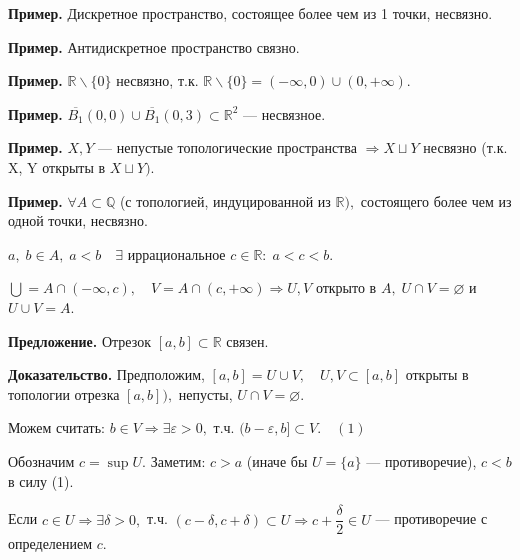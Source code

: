 \documentclass[12pt,a4paper]{article}
\begin{document}
\textbf{Пример.} Дискретное пространство, состоящее более чем из 1 точки, несвязно. 

\textbf{Пример.} Антидискретное пространство связно. 

\textbf{Пример.} $\mathbb{R} \backslash \{0\}$ несвязно, т.к. $\mathbb{R} \backslash \{0\} = (-\infty, 0) \cup (0, +\infty).$ 

\usetikzlibrary{patterns}
\begin{figure}
\end{figure}

\textbf{Пример.} $\overline{B_{1}}(0, 0) \cup \overline{B_{1}}(0, 3) \subset \mathbb{R}^{2}$ --- несвязное.

\textbf{Пример.} $X, Y$ --- непустые топологические пространства $\Rightarrow X \sqcup Y$ несвязно (т.к. X, Y открыты в $X \sqcup Y).$

\textbf{Пример.} $\forall A \subset \mathbb{Q}$ (с топологией, индуцированной из $\mathbb{R}),$ состоящего более чем из одной точки, несвязно.

$a, \; b \in A, \; a  < b \quad \exists$ иррациональное $c \in \mathbb{R}: \; a < c < b.$ 

$\bigcup = A \cap (-\infty, c), \quad V = A \cap (c, +\infty) \Rightarrow U, V$ открыто в $A, \; U \cap V = \varnothing$ и $U \cup V = A.$

\textbf{Предложение.} Отрезок $[a, b] \subset \mathbb{R}$ связен.

\textbf{Доказательство.} Предположим, $[a, b] = U \cup V, \quad U, V \subset [a, b]$ открыты в топологии отрезка $[a, b]),$ непусты, $U \cap V = \varnothing.$

Можем считать: $b \in V \Rightarrow \exists \varepsilon > 0,$ т.ч. $(b - \varepsilon, b] \subset V. \quad (1)$ 

Обозначим $c = \sup U.$ Заметим: $c > a$ (иначе бы $U = \{a\}$ --- противоречие), $c < b$ в силу (1). 

Если $c \in U \Rightarrow \exists \delta > 0,$ т.ч. $(c - \delta, c + \delta) \subset U \Rightarrow c + \dfrac{\delta}{2} \in U$ --- противоречие с определением $c.$
\end{document}
